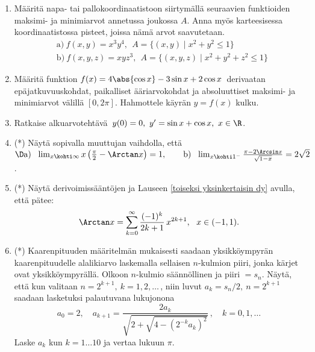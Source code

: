 \begin{enumerate}
\item
Määritä napa- tai pallokoordinaatistoon siirtymällä seuraavien funktioiden maksimi- ja 
minimiarvot annetussa joukossa $A$. Anna myös karteesisessa koordinaatistossa pisteet, 
joissa nämä arvot saavutetaan.
\begin{align*}
&\text{a)}\ f(x,y)=x^3y^4,\ \ A=\{(x,y) \mid x^2+y^2 \le 1\} \\
&\text{b)}\ f(x,y,z)=xyz^3,\ \ A=\{(x,y,z) \mid x^2+y^2+z^2 \le 1\}
\end{align*}

\item
Määritä funktion $f(x)=4\abs{\cos x}-3\sin x+2\cos x\,$ derivaatan epäjatkuvuuskohdat, 
paikalliset ääriarvokohdat ja absoluuttiset maksimi- ja minimiarvot välillä $[0,2\pi]$. 
Hahmottele käyrän $y=f(x)$ kulku.

\item
Ratkaise alkuarvotehtävä $\,y(0)=0,\ y'=\sin x+\cos x,\ x\in\R$.

\item (*)
Näytä sopivalla muuttujan vaihdolla, että \newline
$\D
\text{a)}\ \ \lim_{x\kohti\infty} x\left(\frac{\pi}{2}-\Arctan x\right)=1, \qquad 
\text{b)}\ \ \lim_{x \kohti 1^-} \frac{\pi-2\Arcsin x}{\sqrt{1-x}}=2\sqrt{2}$.

\item (*)
Näytä derivoimissääntöjen ja Lauseen \ref{toiseksi yksinkertaisin dy} avulla, että 
pätee:
\[
\Arctan x=\sum_{k=0}^\infty \frac{(-1)^{k}}{2k+1}\,x^{2k+1},\ \ x\in(-1,1).
\]

\item(*)
Kaarenpituuden määritelmän mukaisesti saadaan yksikköympyrän kaarenpituudelle alalikiarvo
laskemalla sellaisen $n$-kulmion piiri, jonka kärjet ovat yksikköympyrällä. Olkoon $n$-kulmio
säännöllinen ja piiri $=s_n$. Näytä, että kun valitaan $n=2^{k+1},\ k=1,2, \ldots\,$, niin
luvut 
$a_k=s_n/2,\ n=2^{k+1}$ saadaan lasketuksi palautuvana lukujonona
\[
a_0=2, \quad a_{k+1}=\frac{2a_k}{\sqrt{2+\sqrt{4-(2^{-k}a_k)^2}}}\,, \quad k=0,1,\ldots
\]
Laske $a_k$ kun $k=1 \ldots 10$ ja vertaa lukuun $\pi$.
 
\end{enumerate}